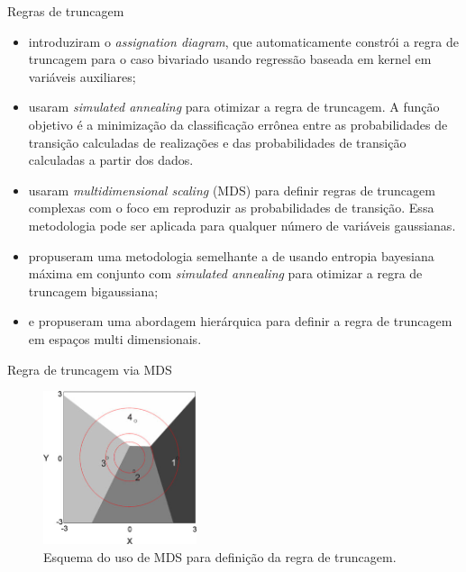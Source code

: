 \documentclass[aspectratio=169]{beamer}
\begin{document}
\begin{frame}[allowframebreaks]{Regras de truncagem}
	\begin{itemize}
		\item \cite{allard2012non} introduziram o \textit{assignation diagram}, que automaticamente constrói a regra de truncagem para o caso bivariado usando regressão baseada em kernel em variáveis auxiliares;
		\item \cite{sadeghi_optimizing} usaram \textit{simulated annealing} para otimizar a regra de truncagem. A função objetivo é a minimização da classificação errônea entre as probabilidades de transição calculadas de realizações e das probabilidades de transição calculadas a partir dos dados.
		\item \cite{deutsch2014multidimensional} usaram \textit{multidimensional scaling} (MDS) para definir regras de truncagem complexas com o foco em reproduzir as probabilidades de transição. Essa metodologia pode ser aplicada para qualquer número de variáveis gaussianas.		 
		\item \cite{astrakova2015truncation} propuseram uma metodologia semelhante a de \cite{deutsch2014multidimensional} usando entropia bayesiana máxima em conjunto com \textit{simulated annealing} para otimizar a regra de truncagem bigaussiana;
		\item \cite{madani2015simulation} e \cite{hier_plurigauss} propuseram uma abordagem hierárquica para definir a regra de truncagem em espaços multi dimensionais.
\end{itemize}
\end{frame}

\begin{frame}{Regra de truncagem via MDS}
			\begin{figure}[H]
		\caption{\label{pluri_mds}Esquema do uso de MDS para definição da regra de truncagem.}
		\begin{center}
			\includegraphics[width=0.4\textwidth]{capitulo_3/pluri_mds.png}
		\end{center}
	\end{figure}
\end{frame}
\end{document}
